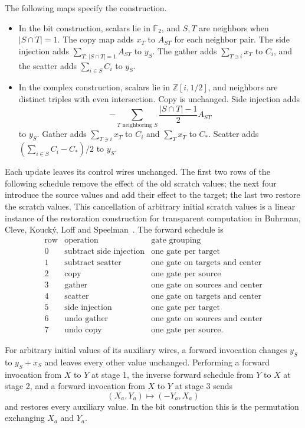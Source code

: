 The following maps specify the construction.
\begin{itemize}
\item In the bit construction, scalars lie in $\mathbb F_2$, and
$S,T$ are neighbors when $|S\cap T|=1$.
The copy map adds $x_T$ to $A_{ST}$ for each neighbor pair.
The side injection adds $\sum_{T:\,|S\cap T|=1}A_{ST}$ to $y_S$.
The gather adds $\sum_{T\ni i}x_T$ to $C_i$, and the scatter adds
$\sum_{i\in S}C_i$ to $y_S$.
\item In the complex construction, scalars lie in
$\mathbb Z[i,1/2]$, and neighbors are distinct triples with even
intersection.  Copy is unchanged.  Side injection adds
\[
 -\sum_{T\text{ neighboring }S}\frac{|S\cap T|-1}{2}A_{ST}
\]
to $y_S$.  Gather adds $\sum_{T\ni i}x_T$ to $C_i$ and
$\sum_Tx_T$ to $C_\ast$.  Scatter adds
$(\sum_{i\in S}C_i-C_\ast)/2$ to $y_S$.
\end{itemize}
Each update leaves its control wires unchanged.  The first two rows of
the following schedule remove the effect of the old scratch values;
the next four introduce the source values and add their effect to the
target; the last two restore the scratch values.
This cancellation of arbitrary initial scratch values is a linear
instance of the restoration construction for transparent computation in
Buhrman, Cleve, Kouck\'y, Loff and Speelman~\cite[Section~3]{BuhrmanCleveKouckyLoffSpeelman2014}.
The forward schedule is
\begin{equation}
\begin{array}{c|l|l}
\text{row}&\text{operation}&\text{gate grouping}\\ \hline
0&\text{subtract side injection}&\text{one gate per target}\\
1&\text{subtract scatter}&\text{one gate on targets and center}\\
2&\text{copy}&\text{one gate per source}\\
3&\text{gather}&\text{one gate on sources and center}\\
4&\text{scatter}&\text{one gate on targets and center}\\
5&\text{side injection}&\text{one gate per target}\\
6&\text{undo gather}&\text{one gate on sources and center}\\
7&\text{undo copy}&\text{one gate per source}.
\end{array}
\label{eq:motif-schedule}
\end{equation}

\begin{lemma}\label{lem:scalar-motifs}
For arbitrary initial values of its auxiliary wires, a forward
invocation changes $y_S$ to $y_S+x_S$ and leaves every other value
unchanged.  Performing a forward invocation from $X$ to $Y$ at stage 1,
the inverse forward schedule from $Y$ to $X$ at stage 2, and a forward
invocation from $X$ to $Y$ at stage 3 sends
\[
 (X_a,Y_a)\longmapsto(-Y_a,X_a)
\]
and restores every auxiliary value.  In the bit construction this is the
permutation exchanging $X_a$ and $Y_a$.
\end{lemma}

